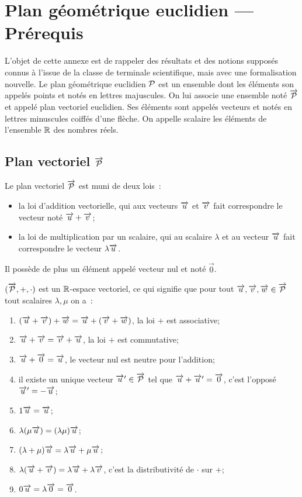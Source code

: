 \chapter{Plan géométrique euclidien --- Prérequis}

L'objet de cette annexe est de rappeler des résultats et des notions supposés 
connus à l'issue de la classe de terminale scientifique, mais avec une 
formalisation nouvelle. Le plan géométrique euclidien \(\P\) est un ensemble dont 
les éléments son appelés points et notés en lettres majuscules. On lui associe 
une ensemble noté \(\vect{\P}\) et appelé plan vectoriel euclidien. Ses éléments 
sont appelés vecteurs et notés en lettres minuscules coiffés d'une flèche. On 
appelle scalaire les éléments de l'ensemble \(\R\) des nombres réels.

\section{Plan vectoriel \(\protect\vect{\P}\)}

Le plan vectoriel \(\vect{\P}\) est muni de deux lois~:
\begin{itemize}
  \item la loi d'addition vectorielle, qui aux vecteurs \(\vu\) et \(\vv\) fait 
    correspondre le vecteur noté \(\vu +\vv\);
  \item la loi de multiplication par un scalaire, qui au scalaire \(\lambda\) et 
    au vecteur \(\vu\) fait correspondre le vecteur \(\lambda \vu\).
\end{itemize}

Il possède de plus un élément appelé vecteur nul et noté \(\vec{0}\).

\begin{prop}
  \((\vect{\P}, +, \cdot)\) est un \(\R\)-espace vectoriel, ce qui signifie que pour 
  tout \(\vu,\vv,\vw \in \vect{\P}\) tout scalaires \(\lambda,\mu\) on a~:
  \begin{enumerate}
    \item \((\vu+\vv)+\vw=\vu +(\vv+\vw)\), la loi \(+\) est associative;
    \item \(\vu+\vv=\vv+\vu\), la loi \(+\) est commutative;
    \item \(\vu+\vect{0}=\vu\), le vecteur nul est neutre pour l'addition;
    \item il existe un unique vecteur \(\vu' \in \vect{\P}\) tel que 
      \(\vu+\vu'=\vect{0}\), c'est l'opposé \(\vu'=-\vu\);
    \item \(1 \vu=\vu\);
    \item \(\lambda(\mu \vu)=(\lambda \mu) \vu\);
    \item \((\lambda+\mu) \vu = \lambda\vu +\mu\vu\);
    \item \(\lambda(\vu+\vv)=\lambda \vu +\lambda\vv\), c'est la distributivité de 
      \(\cdot\) sur \(+\);
    \item \(0 \vu = \lambda \vect{0}=\vect{0}\).
  \end{enumerate}
\end{prop}

